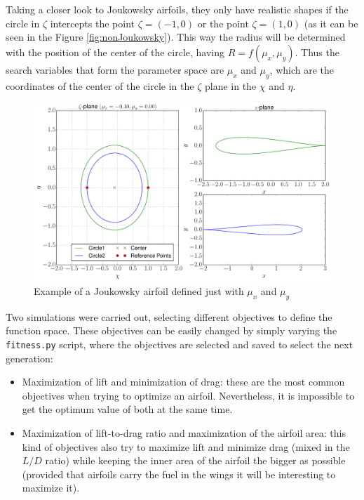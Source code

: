 Taking a closer look to Joukowsky airfoils, they only have realistic shapes if the circle in $\zeta$ intercepts the point $\zeta = (-1,0)$ or the point $\zeta = (1,0)$ (as it can be seen in the Figure \ref{fig:nonJoukowsky}). This way the radius will be determined with the position of the center of the circle, having $R=f(\mu_x,\mu_y)$. Thus the search variables that form the parameter space are $\mu_x$ and $\mu_y$, which are the coordinates of the center of the circle in the $\zeta$ plane in the $\chi$ and $\eta$.

     \begin{figure}[h!]
        \centering
        \includegraphics[width=\textwidth]{Figures/3/J_0.pdf}
        \caption{Example of a Joukowsky airfoil defined just with $\mu_x$ and $\mu_y$}
        \label{fig:joukowskyTheory}
    \end{figure}
    
Two simulations were carried out, selecting different objectives to define the function space. These objectives can be easily changed by simply varying the \texttt{fitness.py} script, where the objectives are selected and saved to select the next generation:

\begin{itemize}
    \item Maximization of lift and minimization of drag: these are the most common objectives when trying to optimize an airfoil. Nevertheless, it is impossible to get the optimum value of both at the same time.
    \item Maximization of lift-to-drag ratio and maximization of the airfoil area: this kind of objectives also try to maximize lift and minimize drag (mixed in the $L/D$ ratio) while keeping the inner area of the airfoil the bigger as possible (provided that airfoils carry the fuel in the wings it will be interesting to maximize it). 
\end{itemize}

